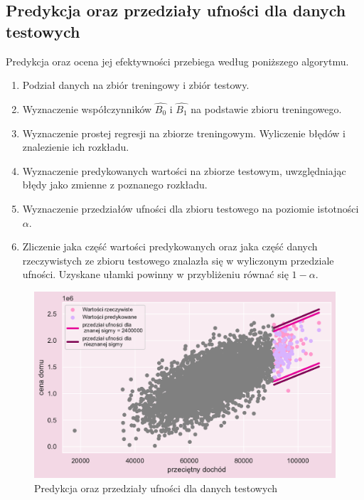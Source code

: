 \documentclass{article}
\begin{document}
\subsection{Predykcja oraz przedziały ufności dla danych testowych}
Predykcja oraz ocena jej efektywności przebiega według poniższego algorytmu.
\begin{enumerate}
    \item Podział danych na zbiór treningowy i zbiór testowy.
    \item Wyznaczenie współczynników $\hat{B_0}$ i $\hat{B_1}$ na podstawie zbioru treningowego.
    \item Wyznaczenie prostej regresji na zbiorze treningowym. Wyliczenie błędów i znalezienie ich rozkładu.
    \item Wyznaczenie predykowanych wartości na zbiorze testowym, uwzględniając błędy jako zmienne z poznanego rozkładu.
    \item Wyznaczenie przedziałów ufności dla zbioru testowego na poziomie istotności $\alpha$.
    \item Zliczenie jaka część wartości predykowanych oraz jaka część danych rzeczywistych ze zbioru testowego znalazła się w wyliczonym przedziale ufności. Uzyskane ułamki powinny w przybliżeniu równać się $1-\alpha$.
\end{enumerate}


    \begin{figure}[H]
	\begin{center}
		\includegraphics[scale=0.68]{images/predykcja.pdf}
		\caption{Predykcja oraz przedziały ufności dla danych testowych}
		\label{prediction1}
	\end{center}
	\end{figure}
 
\end{document}
